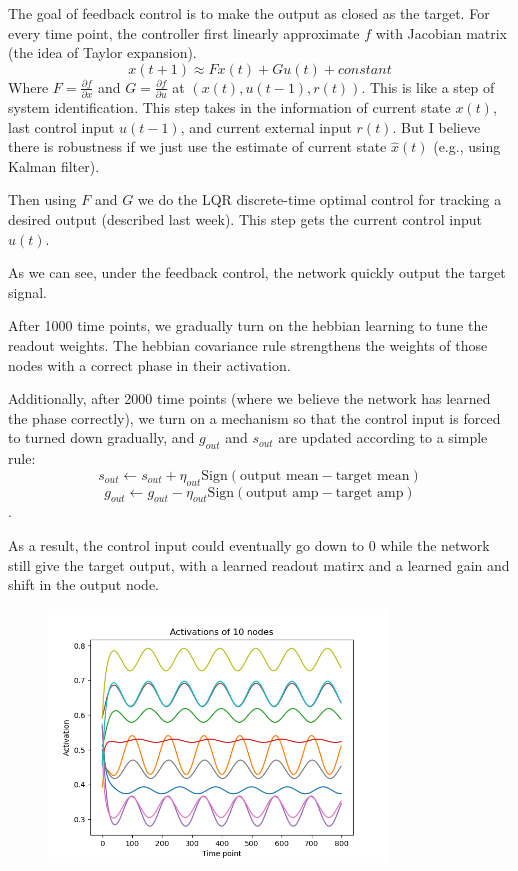 \documentclass[12pt, a4paper]{article}
\begin{document}
The goal of feedback control is to make the output as closed as the target. For every time point, the controller first linearly approximate $f$ with Jacobian matrix (the idea of Taylor expansion).
$$x(t+1) \approx  Fx(t) + Gu(t) + constant$$
Where $F = \frac{\partial f}{\partial x}$ and $G = \frac{\partial f}{\partial u}$ at $(x(t), u(t-1), r(t))$. This is like a step of system identification. This step takes in the information of current state $x(t)$, last control input $u(t-1)$, and current external input $r(t)$. But I believe there is robustness if we just use the estimate of current state $\hat{x}(t)$ (e.g., using Kalman filter).

Then using $F$ and $G$ we do the LQR discrete-time optimal control for tracking a desired output (described last week). This step gets the current control input $u(t)$. 

As we can see, under the feedback control, the network quickly output the target signal.

After 1000 time points, we gradually turn on the hebbian learning to tune the readout weights. The hebbian covariance rule strengthens the weights of those nodes with a correct phase in their activation.

Additionally, after 2000 time points (where we believe the network has learned the phase correctly), we turn on a mechanism so that the control input is forced to turned down gradually, and $g_{out}$ and $s_{out}$ are updated according to a simple rule: $$s_{out} \leftarrow s_{out} + \eta_{out} \text{Sign}(\text{output mean} - \text{target mean})$$
$$g_{out} \leftarrow g_{out} - \eta_{out} \text{Sign}(\text{output amp} - \text{target amp})$$.

As a result, the control input could eventually go down to 0 while the network still give the target output, with a learned readout matirx and a learned gain and shift in the output node.

\begin{figure}[H]
    \centering
    \includegraphics[width=0.8\textwidth]{RNN/FORCE/fig/FORCE_ff_activations.png}
\end{figure}
\end{document}
